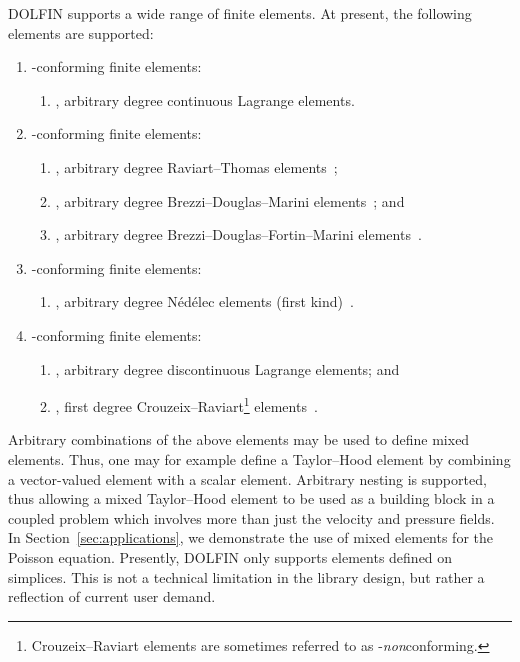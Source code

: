 \documentclass[acmtoms]{acmtrans2m}
\newcommand{\dolfin}{DOLFIN}
\begin{document}
\dolfin{} supports a wide range of finite elements.  At present, the
following elements are supported:
\begin{enumerate}
\item
  -conforming finite elements:
  \begin{enumerate}
  \item
    , arbitrary degree continuous Lagrange elements.
  \end{enumerate}
\item
  -conforming finite elements:
  \begin{enumerate}
  \item
    , arbitrary degree Raviart--Thomas elements~\cite{RavTho77b};
  \item
    , arbitrary degree Brezzi--Douglas--Marini elements~\cite{BreDou85}; and
  \item
    , arbitrary degree
    Brezzi--Douglas--Fortin--Marini elements~\cite{BreDou87}.
  \end{enumerate}
\item
  -conforming finite elements:
  \begin{enumerate}
  \item
    , arbitrary degree N\'ed\'elec elements (first
    kind)~\cite{Ned80}.
  \end{enumerate}
\item
  -conforming finite elements:
  \begin{enumerate}
  \item
    , arbitrary degree discontinuous Lagrange elements; and
  \item
    , first degree Crouzeix--Raviart\footnote{Crouzeix--Raviart elements are sometimes referred to as -\emph{non}conforming.} elements~\cite{CroRav73}.
  \end{enumerate}
\end{enumerate}
Arbitrary combinations of the above elements may be used to define
mixed elements. Thus, one may for example define a Taylor--Hood
element by combining a vector-valued  element with a
scalar  element. Arbitrary nesting is supported, thus
allowing a mixed Taylor--Hood element to be used as a building block
in a coupled problem which involves more than just the
velocity and pressure fields.
In Section~\ref{sec:applications},
we demonstrate the use of mixed elements for the
Poisson equation. Presently, \dolfin{} only supports elements defined
on simplices. This is not a technical limitation in the library
design, but rather a reflection of current user demand.
\end{document}
